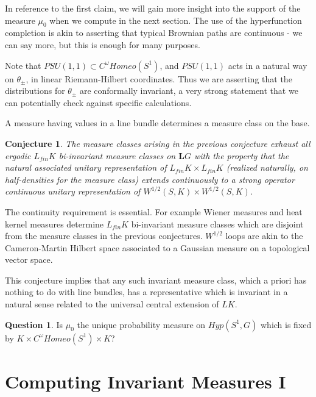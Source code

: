 \documentclass{amsart}
\theoremstyle{conjecture}
\newtheorem{conjecture}{Conjecture}
\theoremstyle{definition}
\theoremstyle{question}
\newtheorem{question}{Question}
\theoremstyle{questions}
\theoremstyle{remark}
\theoremstyle{remarks}
\theoremstyle{example}
\numberwithin{equation}{section}
\begin{document}
In reference to the first claim, we will gain more insight into the support of the measure $\mu_0$ when we compute in the next section. The use of the hyperfunction completion is akin to asserting that typical Brownian paths are continuous - we can say more, but this is enough for many purposes.

Note that $PSU(1,1)\subset C^{\omega}Homeo(S^1)$, and $PSU(1,1)$ acts in a natural way on $\theta_{\pm}$, in linear Riemann-Hilbert coordinates. Thus we are asserting that the distributions for $\theta_{\pm}$ are conformally invariant, a very strong statement that we can potentially check against specific calculations.

A measure having values in a line bundle determines a measure class on the base.

\begin{conjecture}\label{conj3} The measure classes arising in the previous conjecture exhaust all ergodic $L_{fin}K$ bi-invariant measure classes
on $\mathbf L G$ with the property that the natural associated unitary representation of $L_{fin}K \times L_{fin}K$ (realized naturally, on half-densities for the measure class) extends continuously to a strong operator continuous unitary representation of $W^{1/2}(S,K)\times W^{1/2}(S,K)$.

\end{conjecture}

The continuity requirement is essential. For example Wiener measures and heat kernel measures determine $L_{fin}K$ bi-invariant measure classes which are disjoint from the measure classes in the previous conjectures. $W^{1/2}$ loops are akin to the Cameron-Martin Hilbert space associated to a Gaussian measure on a topological vector space.

This conjecture implies that any such invariant measure class, which a priori has nothing to do with line bundles,
has a representative which is invariant in a natural sense related to the universal central extension of $LK$.


\begin{question} Is $\mu_0$ the unique probability measure on $Hyp(S^1,G)$ which is fixed by $K\times C^{\omega}Homeo(S^1)\times K$?
\end{question}


\section{Computing Invariant Measures I}\label{calculate1}
\end{document}
